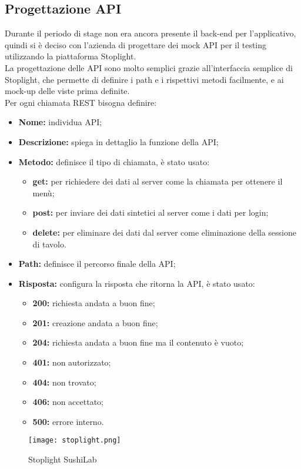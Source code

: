 \subsection{Progettazione API}
Durante il periodo di stage non era ancora presente il back-end per l'applicativo, quindi si è deciso con l'azienda di progettare dei mock API per il testing utilizzando la piattaforma Stoplight.\\
La progettazione delle API sono molto semplici grazie all'interfaccia semplice di Stoplight, che permette di definire i path e i rispettivi metodi facilmente, e ai mock-up delle viste prima definite.\\
Per ogni chiamata REST bisogna definire:
\begin{itemize}
    \item \textbf{Nome:} individua API;
    \item \textbf{Descrizione:} spiega in dettaglio la funzione della API;
    \item \textbf{Metodo:} definisce il tipo di chiamata, è stato usato:
    \begin{itemize}
        \item  \textbf{get:} per richiedere dei dati al server come la chiamata per ottenere il menù;
        \item  \textbf{post:} per inviare dei dati sintetici al server come i dati per login;
        \item  \textbf{delete:} per eliminare dei dati dal server come eliminazione della sessione di tavolo.
    \end{itemize}
    \item \textbf{Path:} definisce il percorso finale della API;
    \item \textbf{Risposta:} configura la risposta che ritorna la API, è stato usato:
    \begin{itemize}
        \item  \textbf{200:} richiesta andata a buon fine;
        \item  \textbf{201:} creazione andata a buon fine;
        \item  \textbf{204:} richiesta andata a buon fine ma il contenuto è vuoto;
        \item  \textbf{401:} non autorizzato;
        \item  \textbf{404:} non trovato;
        \item  \textbf{406:} non accettato;
        \item  \textbf{500:} errore interno.
    \end{itemize}
\end{itemize}
\begin{figure}[H]
    \centering
    \texttt{[image: stoplight.png]}
    \caption{Stoplight SushiLab}
\end{figure}

